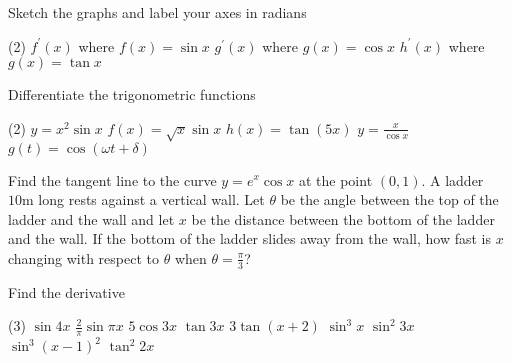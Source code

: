 \begin{Exercise}[title={Standard Derivatives},label=exStandardDerivatives]
\Question Sketch the graphs and label your axes in radians
	\begin{tasks}(2)
	\task $f^{ \prime } (x)$ where $f (x) =\sin  x$ %
	\task $g^{ \prime } (x)$ where $g (x) =\cos  x$  %
	\task $h^{ \prime } (x)$ where $g (x)  =\tan x$  %
\end{tasks}

\Question Differentiate the trigonometric functions
\begin{tasks}(2)
	\task $y =x^{2} \sin  x$ %
	\task $f (x) =\sqrt{x} \sin  x$ %
	\task $h (x) =\tan  (5 x)$ %
	\task $y =\frac{x}{\cos  x}$ %
	\task $g (t) =\cos  (\omega  t +\delta )$ %
\end{tasks}

\Question Find the tangent line to the curve $y =e^{x} \cos  x$ at the point $(0 ,1)$. %
\Question A ladder $10 \mbox{m}$ long rests against a vertical wall. Let $\theta $ be the angle between the top of the ladder and the wall and let $x$ be the distance between the bottom of the ladder and the wall. If the bottom of the ladder slides away from the wall, how fast is $x$ changing with respect to $\theta $ when $\theta  =\frac{\pi }{3}$? %

	\Question Find the derivative
\begin{tasks}(3)
	\task  $\sin  4 x$ %
	\task $\frac{2}{\pi } \sin  \pi  x$ %
	\task $5 \cos  3 x$ %
	\task $\tan  3 x$ 	%
	\task $3 \tan  \left (x +2\right )$  %
	\task $\sin ^{3} x$ %
	\task $\sin ^{2} 3 x$ %
	\task $\sin ^{3} \left (x -1\right )^{2}$ %
	\task $\tan ^{2} 2 x$ %
	
\end{tasks}

\end{Exercise}

